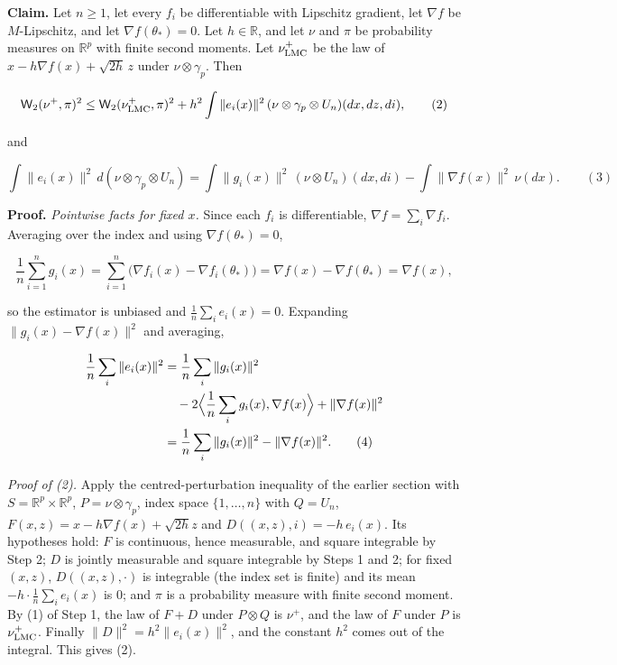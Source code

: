 \documentclass[11pt,a4paper]{report}
\begin{document}
\textbf{Claim.} Let \(n\ge1\), let every \(f_i\) be differentiable with Lipschitz gradient, let \(\nabla f\) be \(M\)-Lipschitz, and let \(\nabla f(\theta_*)=0\). Let \(h\in\mathbb R\), and let \(\nu\) and \(\pi\) be probability measures on \(\mathbb R^p\) with finite second moments. Let \(\nu^+_{\rm LMC}\) be the law of \(x-h\nabla f(x)+\sqrt{2h}\,z\) under \(\nu\otimes\gamma_p\). Then


\[\mathsf W_2(\nu^+,\pi)^2\le\mathsf W_2(\nu^+_{\rm LMC},\pi)^2+h^2\int\|e_i(x)\|^2\,(\nu\otimes\gamma_p\otimes U_n)(dx,dz,di),\qquad(2)\]


and


\[\int\|e_i(x)\|^2\,d(\nu\otimes\gamma_p\otimes U_n)=\int\|g_i(x)\|^2\,(\nu\otimes U_n)(dx,di)-\int\|\nabla f(x)\|^2\,\nu(dx).\qquad(3)\]


\textbf{Proof.} \emph{Pointwise facts for fixed \(x\).} Since each \(f_i\) is differentiable, \(\nabla f=\sum_i\nabla f_i\). Averaging over the index and using \(\nabla f(\theta_*)=0\),


\[\frac1n\sum_{i=1}^ng_i(x)=\sum_{i=1}^n\bigl(\nabla f_i(x)-\nabla f_i(\theta_*)\bigr)=\nabla f(x)-\nabla f(\theta_*)=\nabla f(x),\]


so the estimator is unbiased and \(\frac1n\sum_ie_i(x)=0\). Expanding \(\|g_i(x)-\nabla f(x)\|^2\) and averaging,


\[\begin{aligned}
\frac1n\sum_i\|e_i(x)\|^2
&=\frac1n\sum_i\|g_i(x)\|^2\\
&\quad-2\Bigl\langle\frac1n\sum_ig_i(x),\nabla f(x)\Bigr\rangle
  +\|\nabla f(x)\|^2\\
&=\frac1n\sum_i\|g_i(x)\|^2-\|\nabla f(x)\|^2.
\qquad(4)
\end{aligned}\]


\emph{Proof of (2).} Apply the centred-perturbation inequality of the earlier section with \(S=\mathbb R^p\times\mathbb R^p\), \(P=\nu\otimes\gamma_p\), index space \(\{1,\dots,n\}\) with \(Q=U_n\), \(F(x,z)=x-h\nabla f(x)+\sqrt{2h}z\) and \(D((x,z),i)=-h\,e_i(x)\). Its hypotheses hold: \(F\) is continuous, hence measurable, and square integrable by Step 2; \(D\) is jointly measurable and square integrable by Steps 1 and 2; for fixed \((x,z)\), \(D((x,z),\cdot)\) is integrable (the index set is finite) and its mean \(-h\cdot\frac1n\sum_ie_i(x)\) is \(0\); and \(\pi\) is a probability measure with finite second moment. By (1) of Step 1, the law of \(F+D\) under \(P\otimes Q\) is \(\nu^+\), and the law of \(F\) under \(P\) is \(\nu^+_{\rm LMC}\). Finally \(\|D\|^2=h^2\|e_i(x)\|^2\), and the constant \(h^2\) comes out of the integral. This gives (2).
\end{document}

